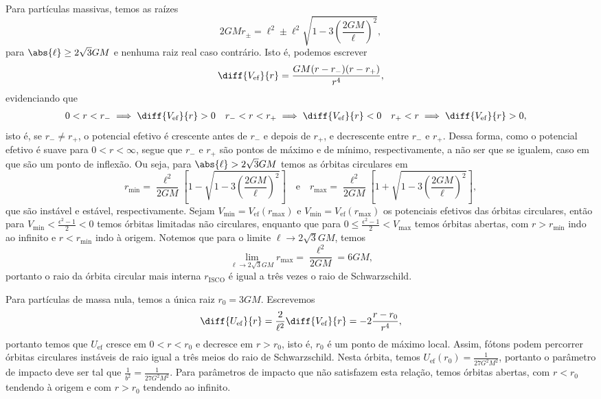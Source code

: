 Para partículas massivas, temos as raízes
\begin{equation*}
    2GM r_{\pm} = \ell^2 \pm \ell^2\sqrt{1 - 3 \left(\frac{2GM}{\ell}\right)^2},
\end{equation*}
para \(\abs{\ell} \geq 2\sqrt{3} GM\) e nenhuma raiz real caso contrário. Isto é, podemos escrever
\begin{equation*}
    \diff{V_\mathrm{ef}}{r} = \frac{GM (r - r_-)(r-r_+)}{r^4},
\end{equation*}
evidenciando que
\begin{align*}
    0 < r < r_- &\implies \diff{V_\mathrm{ef}}{r} > 0& r_- < r < r_+ &\implies \diff{V_\mathrm{ef}}{r} < 0 & r_+ < r &\implies \diff{V_\mathrm{ef}}{r} > 0,
\end{align*}
isto é, se \(r_- \neq r_+\), o potencial efetivo é crescente antes de \(r_-\) e depois de \(r_+\), e decrescente entre \(r_-\) e \(r_+\). Dessa forma, como o potencial efetivo é suave para \(0 < r < \infty\), segue que \(r_-\) e \(r_+\) são pontos de máximo e de mínimo, respectivamente, a não ser que se igualem, caso em que são um ponto de inflexão. Ou seja, para \(\abs{\ell} > 2\sqrt{3}GM\) temos as órbitas circulares em
\begin{equation*}
    r_\mathrm{min} = \frac{\ell^2}{2GM}\left[1 - \sqrt{1 - 3\left(\frac{2GM}{\ell}\right)^2}\right]\quad\text{e}\quad
    r_\mathrm{max} = \frac{\ell^2}{2GM}\left[1 + \sqrt{1 - 3\left(\frac{2GM}{\ell}\right)^2}\right],
\end{equation*}
que são instável e estável, respectivamente. Sejam \(V_\mathrm{min} = V_\mathrm{ef}(r_\mathrm{max})\) e \(V_\mathrm{min} = V_\mathrm{ef}(r_\mathrm{max})\) os potenciais efetivos das órbitas circulares, então para \(V_\mathrm{min} < \frac{\epsilon^2 - 1}{2} < 0\) temos órbitas limitadas não circulares, enquanto que para \(0 \leq \frac{\epsilon^2 - 1}{2} < V_\mathrm{max}\) temos órbitas abertas, com \(r > r_\mathrm{min}\) indo ao infinito e \(r < r_\mathrm{min}\) indo à origem. Notemos que para o limite \(\ell \to 2\sqrt{3}GM\), temos
\begin{equation*}
    \lim_{\ell \to 2\sqrt{3}GM} r_\mathrm{max} = \frac{\ell^2}{2GM} = 6GM,
\end{equation*}
portanto o raio da órbita circular mais interna \(r_\mathrm{ISCO}\) é igual a três vezes o raio de Schwarzschild.

Para partículas de massa nula, temos a única raiz \(r_0 = 3GM\). Escrevemos
\begin{equation*}
    \diff{U_\mathrm{ef}}{r} = \frac{2}{\ell^2}\diff{V_\mathrm{ef}}{r} = -2\frac{r - r_0}{r^4},
\end{equation*}
portanto temos que \(U_\mathrm{ef}\) cresce em \(0 < r < r_0\) e decresce em \(r > r_0\), isto é, \(r_0\) é um ponto de máximo local. Assim, fótons podem percorrer órbitas circulares instáveis de raio igual a três meios do raio de Schwarzschild. Nesta órbita, temos \(U_\mathrm{ef}(r_0) = \frac{1}{27 G^2M^2}\), portanto o parâmetro de impacto deve ser tal que \(\frac1{b^2} = \frac{1}{27G^2M^2}\). Para parâmetros de impacto que não satisfazem esta relação, temos órbitas abertas, com \(r < r_0\) tendendo à origem e com \(r > r_0\) tendendo ao infinito.

